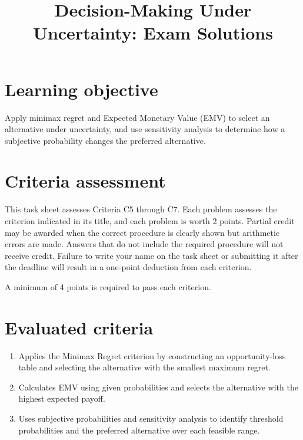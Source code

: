 \makeatletter
{}
\makeatother



\title{Decision-Making Under Uncertainty: Exam Solutions}
\author{}
\date{}


	\maketitle
	\vspace{-2cm}
	\setcounter{tocdepth}{1}
	\setcounter{secnumdepth}{2}
	\label{toc}
	\tableofcontents
	
	\vspace{-5mm}
	\section*{Learning objective}\vspace{-5mm}
	Apply minimax regret and Expected Monetary Value (EMV) to select an alternative under uncertainty, and use sensitivity analysis to determine how a subjective probability changes the preferred alternative.
	
	\section*{Criteria assessment}\vspace{-5mm}
	This task sheet assesses Criteria C5 through C7. Each problem assesses the criterion indicated in its title, and each problem is worth 2 points.
	Partial credit may be awarded when the correct procedure is clearly shown but arithmetic errors are made. Answers that do not include the required procedure will not receive credit.
	Failure to write your name on the task sheet or submitting it after the deadline will result in a one-point deduction from each criterion.
	
	A minimum of 4 points is required to pass each criterion.
	
	\section*{Evaluated criteria}
	\begin{enumerate}[label=\textbf{C\arabic*}, start=5]
		\item Applies the Minimax Regret criterion by constructing an opportunity-loss table and selecting the alternative with the smallest maximum regret.
		\item Calculates EMV using given probabilities and selects the alternative with the highest expected payoff.
		\item Uses subjective probabilities and sensitivity analysis to identify threshold probabilities and the preferred alternative over each feasible range.
	\end{enumerate}
	
